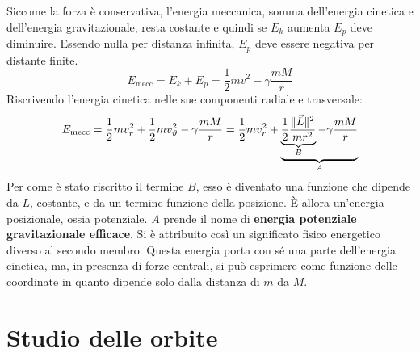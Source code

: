 \documentclass[10pt,a4paper]{book}
\DeclarePairedDelimiter{\norma}{\lVert}{\rVert} %
\begin{document}
Siccome la forza è conservativa, l'energia meccanica, somma dell'energia cinetica e dell'energia gravitazionale, resta costante e quindi se $E_k$ aumenta $E_p$ deve diminuire. Essendo nulla per distanza infinita, $E_p$ deve essere negativa per distante finite.
\[
	E_\text{mecc}=E_k+E_p=\frac{1}{2}mv^2-\gamma\frac{mM}{r}
\]
Riscrivendo l'energia cinetica nelle sue componenti radiale e trasversale:
\[
	E_\text{mecc}=\frac{1}{2}mv_r^2+\frac{1}{2}mv_\vartheta^2-\gamma \frac{mM}{r}=\frac{1}{2}mv_r^2+\underbrace{\underbrace{\frac{1}{2}\frac{\norma{\vec{L}}^2}{mr^2}}_B-\gamma\frac{mM}{r}}_A
\]
Per come è stato riscritto il termine $B$, esso è diventato una funzione che dipende da $L$, costante, e da un termine funzione della posizione. È allora un'energia posizionale, ossia potenziale. $A$ prende il nome di \textbf{energia potenziale gravitazionale efficace}. Si è attribuito così un significato fisico energetico diverso al secondo membro. Questa energia porta con sé una parte dell'energia cinetica, ma, in presenza di forze centrali, si può esprimere come funzione delle coordinate in quanto dipende solo dalla distanza di $m$ da $M$.







































\section{Studio delle orbite}
\end{document}
